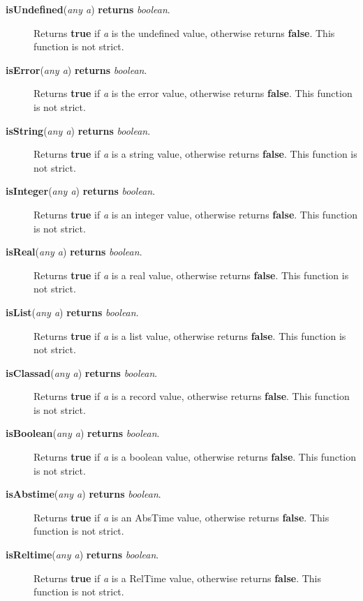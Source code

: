 \documentclass{article}
\begin{document}
\begin{description}

\item[\textbf{isUndefined}(\emph{any a}) \textbf{returns} \emph{boolean}.]
Returns \textbf{true} if \emph{a} is the undefined value, otherwise
returns \textbf{false}.
This function is not strict.

\item[\textbf{isError}(\emph{any a}) \textbf{returns} \emph{boolean}.]
Returns \textbf{true} if \emph{a} is the error value, otherwise
returns \textbf{false}.
This function is not strict.

\item[\textbf{isString}(\emph{any a}) \textbf{returns} \emph{boolean}.]
Returns \textbf{true} if \emph{a} is a string value, otherwise
returns \textbf{false}.
This function is not strict.

\item[\textbf{isInteger}(\emph{any a}) \textbf{returns} \emph{boolean}.]
Returns \textbf{true} if \emph{a} is an integer value, otherwise
returns \textbf{false}.
This function is not strict.

\item[\textbf{isReal}(\emph{any a}) \textbf{returns} \emph{boolean}.]
Returns \textbf{true} if \emph{a} is a real value, otherwise
returns \textbf{false}.
This function is not strict.

\item[\textbf{isList}(\emph{any a}) \textbf{returns} \emph{boolean}.]
Returns \textbf{true} if \emph{a} is a list value, otherwise
returns \textbf{false}.
This function is not strict.

\item[\textbf{isClassad}(\emph{any a}) \textbf{returns} \emph{boolean}.]
Returns \textbf{true} if \emph{a} is a record value, otherwise
returns \textbf{false}.
This function is not strict.

\item[\textbf{isBoolean}(\emph{any a}) \textbf{returns} \emph{boolean}.]
Returns \textbf{true} if \emph{a} is a boolean value, otherwise
returns \textbf{false}.
This function is not strict.

\item[\textbf{isAbstime}(\emph{any a}) \textbf{returns} \emph{boolean}.]
Returns \textbf{true} if \emph{a} is an AbsTime value, otherwise
returns \textbf{false}.
This function is not strict.

\item[\textbf{isReltime}(\emph{any a}) \textbf{returns} \emph{boolean}.]
Returns \textbf{true} if \emph{a} is a RelTime value, otherwise
returns \textbf{false}.
This function is not strict.


\end{description}
\end{document}
